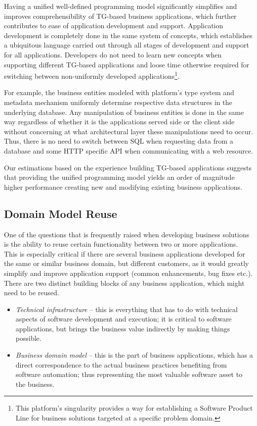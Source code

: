   Having a unified well-defined programming model significantly simplifies and improves comprehensibility of TG-based business applications, which further contributes to ease of application development and support.
  Application development is completely done in the same system of concepts, which establishes a ubiquitous language carried out through all stages of development and support for all applications.
  Developers do not need to learn new concepts when supporting different TG-based applications and loose time otherwise required for switching between non-uniformly developed applications\footnote{This platform's singularity provides a way for establishing a Software Product Line for business solutions targeted at a specific problem domain.}.
  
  For example, the business entities modeled with platform's type system and metadata mechanism uniformly determine respective data structures in the underlying database.
  Any manipulation of business entities is done in the same way regardless of whether it is the applications served side or the client side without concerning at what architectural layer these manipulations need to occur.
  Thus, there is no need to switch between SQL when requesting data from a database and some HTTP specific API when communicating with a web resource.

  Our estimations based on the experience building TG-based applications suggests that providing the unified programming model yields an order of magnitude higher performance creating new and modifying existing business applications.

\subsection{Domain Model Reuse}
  One of the questions that is frequently raised when developing business solutions is the ability to reuse certain functionality between two or more applications.
  This is especially critical if there are several business applications developed for the same or similar business domain, but different customers, as it would greatly simplify and improve application support (common enhancements, bug fixes etc.).
  There are two distinct building blocks of any business application, which might need to be reused.
  \begin{itemize}
   \item \emph{Technical infrastructure} -- this is everything that has to do with technical aspects of software development and execution; it is critical to software applications, but brings the business value indirectly by making things possible.
    \item \emph{Business domain model} --  this is the part of business applications, which has a direct correspondence to the actual business practices benefiting from software automation; thus representing the most valuable software asset to the business.
  \end{itemize}

